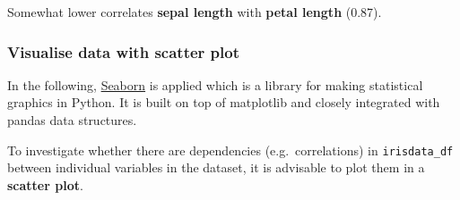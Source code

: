 \documentclass [oneside,10pt,a4paper,ngerman,BCOR10mm,headsepline,parindent,final]{scrartcl}
\begin{document}
Somewhat lower correlates \textbf{sepal length} with \textbf{petal
length} (0.87).

    \hypertarget{visualise-data-with-scatter-plot}{%
\subsubsection{\texorpdfstring{Visualise data with \textbf{scatter
plot}}{Visualise data with scatter plot}}\label{visualise-data-with-scatter-plot}}

In the following, \href{https://seaborn.pydata.org/}{Seaborn} is applied
which is a library for making statistical graphics in Python. It is
built on top of matplotlib and closely integrated with pandas data
structures.

To investigate whether there are dependencies (e.g.~correlations) in
\texttt{irisdata\_df} between individual variables in the dataset, it is
advisable to plot them in a \textbf{scatter plot}.
\end{document}
